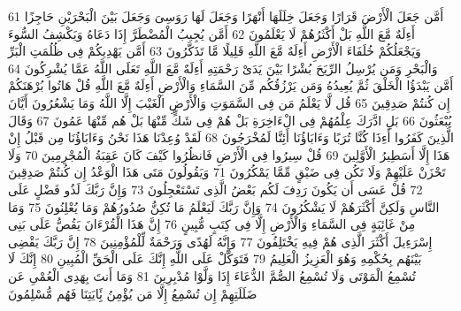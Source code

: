\documentclass[20pt,a4paper]{article}
\begin{document}
{\tiny\colorbox{cl_aya}{61}} أَمَّن جَعَلَ الْأَرْضَ قَرَارًا وَجَعَلَ خِلَلَهَا أَنْهَرًا وَجَعَلَ لَهَا رَوَسِىَ وَجَعَلَ بَيْنَ الْبَحْرَيْنِ حَاجِزًا أَءِلَهٌ مَّعَ اللَّهِ بَلْ أَكْثَرُهُمْ لَا يَعْلَمُونَ
{\tiny\colorbox{cl_aya}{62}} أَمَّن يُجِيبُ الْمُضْطَرَّ إِذَا دَعَاهُ وَيَكْشِفُ السُّوءَ وَيَجْعَلُكُمْ خُلَفَاءَ الْأَرْضِ أَءِلَهٌ مَّعَ اللَّهِ قَلِيلًا مَّا تَذَكَّرُونَ
{\tiny\colorbox{cl_aya}{63}} أَمَّن يَهْدِيكُمْ فِى ظُلُمَتِ الْبَرِّ وَالْبَحْرِ وَمَن يُرْسِلُ الرِّيَحَ بُشْرًا بَيْنَ يَدَىْ رَحْمَتِهِ أَءِلَهٌ مَّعَ اللَّهِ تَعَلَى اللَّهُ عَمَّا يُشْرِكُونَ
{\tiny\colorbox{cl_aya}{64}} أَمَّن يَبْدَؤُا الْخَلْقَ ثُمَّ يُعِيدُهُ وَمَن يَرْزُقُكُم مِّنَ السَّمَاءِ وَالْأَرْضِ أَءِلَهٌ مَّعَ اللَّهِ قُلْ هَاتُوا بُرْهَنَكُمْ إِن كُنتُمْ صَدِقِينَ
{\tiny\colorbox{cl_aya}{65}} قُل لَّا يَعْلَمُ مَن فِى السَّمَوَتِ وَالْأَرْضِ الْغَيْبَ إِلَّا اللَّهُ وَمَا يَشْعُرُونَ أَيَّانَ يُبْعَثُونَ
{\tiny\colorbox{cl_aya}{66}} بَلِ ادَّرَكَ عِلْمُهُمْ فِى الْءَاخِرَةِ بَلْ هُمْ فِى شَكٍّ مِّنْهَا بَلْ هُم مِّنْهَا عَمُونَ
{\tiny\colorbox{cl_aya}{67}} وَقَالَ الَّذِينَ كَفَرُوا أَءِذَا كُنَّا تُرَبًا وَءَابَاؤُنَا أَئِنَّا لَمُخْرَجُونَ
{\tiny\colorbox{cl_aya}{68}} لَقَدْ وُعِدْنَا هَذَا نَحْنُ وَءَابَاؤُنَا مِن قَبْلُ إِنْ هَذَا إِلَّا أَسَطِيرُ الْأَوَّلِينَ
{\tiny\colorbox{cl_aya}{69}} قُلْ سِيرُوا فِى الْأَرْضِ فَانظُرُوا كَيْفَ كَانَ عَقِبَةُ الْمُجْرِمِينَ
{\tiny\colorbox{cl_aya}{70}} وَلَا تَحْزَنْ عَلَيْهِمْ وَلَا تَكُن فِى ضَيْقٍ مِّمَّا يَمْكُرُونَ
{\tiny\colorbox{cl_aya}{71}} وَيَقُولُونَ مَتَى هَذَا الْوَعْدُ إِن كُنتُمْ صَدِقِينَ
{\tiny\colorbox{cl_aya}{72}} قُلْ عَسَى أَن يَكُونَ رَدِفَ لَكُم بَعْضُ الَّذِى تَسْتَعْجِلُونَ
{\tiny\colorbox{cl_aya}{73}} وَإِنَّ رَبَّكَ لَذُو فَضْلٍ عَلَى النَّاسِ وَلَكِنَّ أَكْثَرَهُمْ لَا يَشْكُرُونَ
{\tiny\colorbox{cl_aya}{74}} وَإِنَّ رَبَّكَ لَيَعْلَمُ مَا تُكِنُّ صُدُورُهُمْ وَمَا يُعْلِنُونَ
{\tiny\colorbox{cl_aya}{75}} وَمَا مِنْ غَائِبَةٍ فِى السَّمَاءِ وَالْأَرْضِ إِلَّا فِى كِتَبٍ مُّبِينٍ
{\tiny\colorbox{cl_aya}{76}} إِنَّ هَذَا الْقُرْءَانَ يَقُصُّ عَلَى بَنِى إِسْرَءِيلَ أَكْثَرَ الَّذِى هُمْ فِيهِ يَخْتَلِفُونَ
{\tiny\colorbox{cl_aya}{77}} وَإِنَّهُ لَهُدًى وَرَحْمَةٌ لِّلْمُؤْمِنِينَ
{\tiny\colorbox{cl_aya}{78}} إِنَّ رَبَّكَ يَقْضِى بَيْنَهُم بِحُكْمِهِ وَهُوَ الْعَزِيزُ الْعَلِيمُ
{\tiny\colorbox{cl_aya}{79}} فَتَوَكَّلْ عَلَى اللَّهِ إِنَّكَ عَلَى الْحَقِّ الْمُبِينِ
{\tiny\colorbox{cl_aya}{80}} إِنَّكَ لَا تُسْمِعُ الْمَوْتَى وَلَا تُسْمِعُ الصُّمَّ الدُّعَاءَ إِذَا وَلَّوْا مُدْبِرِينَ
{\tiny\colorbox{cl_aya}{81}} وَمَا أَنتَ بِهَدِى الْعُمْىِ عَن ضَلَلَتِهِمْ إِن تُسْمِعُ إِلَّا مَن يُؤْمِنُ بَِٔايَتِنَا فَهُم مُّسْلِمُونَ
\end{document}
